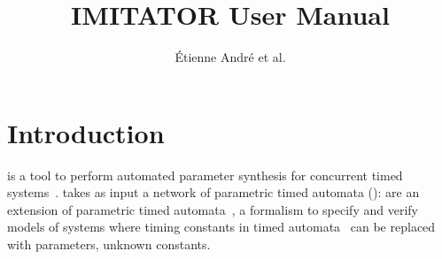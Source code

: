 
\newcommand{\titleOnHeader}{\textsf{IMITATOR} user manual}

\newcommand{\titleOnFirstPage}{IMITATOR User Manual}




\title{IMITATOR User Manual}
\author{Étienne André et al.}












\chapter{Introduction}

\imitator{} is a tool to perform automated parameter synthesis for concurrent timed systems~\cite{Andre21}.
\imitator{} takes as input a network of \imitator{} parametric timed automata (\NIPTA{}): \NIPTA{} are an extension of parametric timed automata~\cite{AHV93}, a formalism to specify and verify models of systems where timing constants in timed automata~\cite{AD94} can be replaced with parameters, \ie{} unknown constants.

